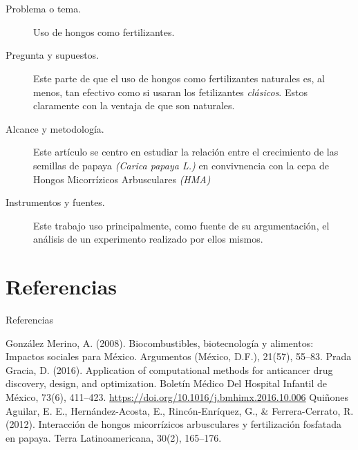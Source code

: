 \documentclass[12pt]{beamer}
\begin{document}
\section{\cite{inv 3}}
	\begin{frame}{\cite{inv 3}}
		\begin{description}
			\item[Problema o tema.] Uso de hongos como fertilizantes.
			\item[Pregunta y supuestos.] Este parte de que el uso de hongos como fertilizantes naturales es, al menos, tan efectivo como si usaran los fetilizantes \textit{clásicos}. Estos claramente con la ventaja de que son naturales.
		\end{description}
	\end{frame}
	\begin{frame}{\cite{inv 3}}
		\begin{description}
			\item[Alcance y metodología.] Este artículo se centro en estudiar la relación entre el crecimiento de las semillas de papaya \textit{(Carica papaya L.)} en convivnencia con la cepa de Hongos Micorrízicos Arbusculares \textit{(HMA)}
			\item[Instrumentos y fuentes.] Este trabajo uso principalmente, como fuente de su argumentación, el análisis de un experimento realizado por ellos mismos.
		\end{description}
		
	\end{frame}




\newpage
\scriptsize
\section{Referencias}
\begin{frame}{Referencias}
	\begin{thebibliography}{X}
		 González Merino, A. (2008). Biocombustibles, biotecnología y alimentos: Impactos sociales para México. Argumentos (México, D.F.), 21(57), 55–83.
		 Prada Gracia, D. (2016). Application of computational methods for anticancer drug discovery, design, and optimization. Boletín Médico Del Hospital Infantil de México, 73(6), 411–423. \url{https://doi.org/10.1016/j.bmhimx.2016.10.006}
		 Quiñones Aguilar, E. E., Hernández-Acosta, E., Rincón-Enríquez, G., \& Ferrera-Cerrato, R. (2012). Interacción de hongos micorrízicos arbusculares y fertilización fosfatada en papaya. Terra Latinoamericana, 30(2), 165–176.
	\end{thebibliography}
\end{frame}
\end{document}
